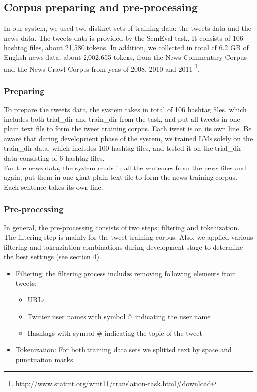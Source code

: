 \documentclass[11pt,a4paper]{article}
\begin{document}
\subsection{Corpus preparing and pre-processing}
In our system, we used two distinct sets of training data: the tweets data and the news data. The tweets data is provided by the SemEval task. It consists of 106 hashtag files, about 21,580 tokens. In addition, we collected in total of 6.2 GB of English news data, about 2,002,655 tokens, from the News Commentary Corpus and the News Crawl Corpus from yeas of 2008, 2010 and 2011 \footnote{http://www.statmt.org/wmt11/translation-task.html\#download}.   
\subsubsection{Preparing}
To prepare the tweets data, the system takes in total of 106 hashtag files, which includes both trial\_dir and train\_dir from the task, and put all tweets in one plain text file to form the tweet training corpus. Each tweet is on its own line. Be aware that during development phase of the system, we trained LMs solely on the train\_dir data, which includes 100 hashtag files, and tested it on the trial\_dir data consisting of 6 hashtag files. \\
For the news data, the system reads in all the sentences from the news files and again, put them in one giant plain text file to form the news training corpus. Each sentence takes its own line.
\subsubsection{Pre-processing}
In general, the pre-processing consists of two steps: filtering and tokenization. The filtering step is mainly for the tweet training corpus. Also, we applied various filtering and tokenziation combinations during development stage to determine the best settings (see section 4). 
\begin{itemize}
\item Filtering: the filtering process includes removing following elements from tweets:
\begin{itemize}
\item URLs
\item Twitter user names with symbol @ indicating the user name
\item Hashtags with symbol \# indicating the topic of the tweet
\end{itemize}
\item Tokenization: For both training data sets we splitted text by space and punctuation marks
\end{itemize}
\end{document}
